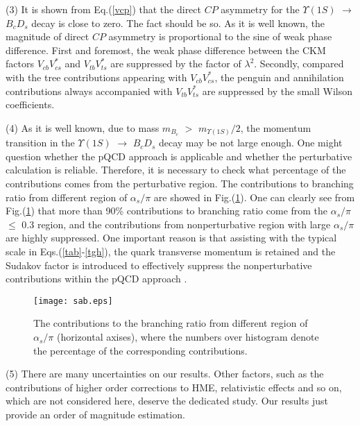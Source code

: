 \documentclass[preprint,superscriptaddress,nofootinbib]{revtex4}
\begin{document}
  (3)
  It is shown from Eq.(\ref{vcp}) that the direct $CP$ asymmetry
  for the ${\Upsilon}(1S)$ ${\to}$ $B_{c}D_{s}$ decay is close
  to zero. The fact should be so.
  As it is well known, the magnitude of direct $CP$
  asymmetry is proportional to the sine of weak phase difference.
  First and foremost, the weak phase difference between the CKM factors
  $V_{cb}V_{cs}^{\ast}$ and $V_{tb}V_{ts}^{\ast}$ are
  suppressed by the factor of ${\lambda}^{2}$.
  Secondly, compared with the tree contributions
  appearing with $V_{cb}V_{cs}^{\ast}$,
  the penguin and annihilation contributions always
  accompanied with $V_{tb}V_{ts}^{\ast}$
  are suppressed by the small Wilson coefficients.

  (4)
  As it is well known, due to mass $m_{B_{c}}$ $>$ $m_{{\Upsilon}(1S)}/2$,
  the momentum transition in the ${\Upsilon}(1S)$ ${\to}$ $B_{c}D_{s}$
  decay may be not large enough. One might question whether the
  pQCD approach is applicable and whether the perturbative calculation
  is reliable. Therefore, it is necessary to check what percentage
  of the contributions comes from the perturbative region.
  The contributions to branching ratio from different region of
  ${\alpha}_{s}/{\pi}$ are showed in Fig.(\ref{fig:br-as}).
  One can clearly see from Fig.(\ref{fig:br-as}) that
  more than 90\% contributions to branching ratio come from
  the ${\alpha}_{s}/{\pi}$ ${\le}$ $0.3$ region, and the
  contributions from nonperturbative region with large
  ${\alpha}_{s}/{\pi}$ are highly suppressed. One important
  reason is that assisting with the typical
  scale in Eqs.(\ref{tab}-\ref{tgh}), the quark transverse momentum is
  retained and the Sudakov factor is introduced to effectively
  suppress the nonperturbative contributions within
  the pQCD approach \cite{pqcd1,pqcd2,pqcd3}.

  \begin{figure}[h]
  \texttt{[image: sab.eps]}
  \caption{The contributions to the branching ratio from different
  region of ${\alpha}_{s}/{\pi}$ (horizontal axises), where the
  numbers over histogram denote the percentage of the corresponding
  contributions.}
  \label{fig:br-as}
  \end{figure}

  (5)
  There are many uncertainties on our results.
  Other factors, such as the contributions of higher
  order corrections to HME, relativistic effects
  and so on, which are not considered here,
  deserve the dedicated study.
  Our results just provide an order of magnitude estimation.
\end{document}

